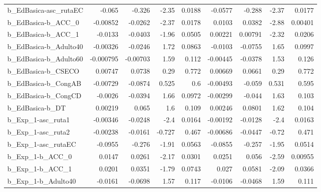 \begin{tabular}{lrrrrrrrr}
b\_EdBasica-asc\_rutaEC      &      -0.065 &       -0.326 &     -2.35 &   0.0188 &    -0.0577 &      -0.288 &        -2.37 &        0.0177 \\
b\_EdBasica-b\_ACC\_0         &    -0.00852 &      -0.0262 &     -2.37 &   0.0178 &     0.0103 &      0.0382 &        -2.88 &       0.00401 \\
b\_EdBasica-b\_ACC\_1         &     -0.0133 &      -0.0403 &     -1.96 &   0.0505 &    0.00221 &     0.00791 &        -2.32 &        0.0206 \\
b\_EdBasica-b\_Adulto40      &    -0.00326 &      -0.0246 &      1.72 &   0.0863 &    -0.0103 &     -0.0755 &         1.65 &        0.0997 \\
b\_EdBasica-b\_Adulto60      &   -0.000795 &     -0.00703 &      1.59 &    0.112 &   -0.00445 &     -0.0378 &         1.53 &         0.126 \\
b\_EdBasica-b\_CSECO         &     0.00747 &       0.0738 &      0.29 &    0.772 &    0.00669 &      0.0661 &         0.29 &         0.772 \\
b\_EdBasica-b\_CongAB        &    -0.00729 &      -0.0874 &     0.525 &      0.6 &   -0.00493 &      -0.059 &        0.531 &         0.595 \\
b\_EdBasica-b\_CongCD        &     -0.0026 &      -0.0394 &      1.66 &   0.0972 &   -0.00299 &      -0.044 &         1.63 &         0.103 \\
b\_EdBasica-b\_DT            &     0.00219 &        0.065 &       1.6 &    0.109 &    0.00246 &      0.0801 &         1.62 &         0.104 \\
b\_Exp\_1-asc\_ruta1          &    -0.00346 &      -0.0248 &      -2.4 &   0.0164 &   -0.00192 &     -0.0128 &         -2.4 &        0.0163 \\
b\_Exp\_1-asc\_ruta2          &    -0.00238 &      -0.0161 &    -0.727 &    0.467 &   -0.00686 &     -0.0447 &        -0.72 &         0.471 \\
b\_Exp\_1-asc\_rutaEC         &     -0.0955 &       -0.276 &     -1.91 &   0.0563 &    -0.0855 &      -0.257 &        -1.95 &        0.0514 \\
b\_Exp\_1-b\_ACC\_0            &      0.0147 &       0.0261 &     -2.17 &   0.0301 &     0.0251 &       0.056 &        -2.59 &       0.00955 \\
b\_Exp\_1-b\_ACC\_1            &      0.0201 &       0.0351 &     -1.79 &   0.0743 &      0.027 &      0.0581 &        -2.09 &        0.0366 \\
b\_Exp\_1-b\_Adulto40         &     -0.0161 &      -0.0698 &      1.57 &    0.117 &    -0.0106 &     -0.0468 &         1.59 &         0.111 \\

\end{tabular}
